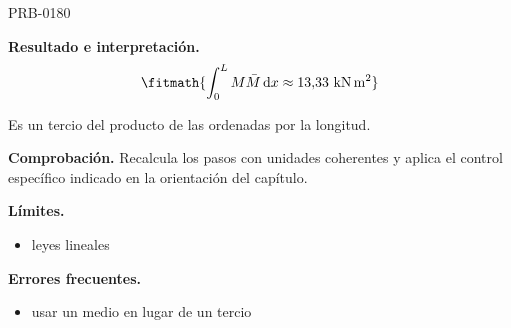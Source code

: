 \begin{studiumworked}{PRB-0180}
\begin{enumerate}
\end{enumerate}

\textbf{Resultado e interpretación.}\[\fitmath{\int_0^L M\bar{M}\,\mathrm{d}x \approx 13{,}33\ \mathrm{kN\,m^2}}\]

Es un tercio del producto de las ordenadas por la longitud.

\par\textbf{Comprobación.} Recalcula los pasos con unidades coherentes y aplica el control específico indicado en la orientación del capítulo.

\textbf{Límites.}\begin{itemize}\item leyes lineales\end{itemize}

\textbf{Errores frecuentes.}\begin{itemize}\item usar un medio en lugar de un tercio\end{itemize}

\end{studiumworked}

\Needspace{.3\textheight}

